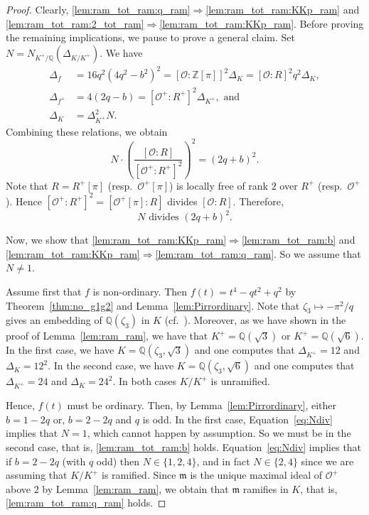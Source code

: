\documentclass[11pt]{amsart}
\newcommand\Q{\mathbb{Q}}
\newcommand\Z{\mathbb{Z}}
\newcommand\cO{\mathcal{O}}
\newcommand\frm{\mathfrak{m}}
\theoremstyle{plain}
\theoremstyle{definition}
\begin{document}
\begin{proof}
    Clearly, \ref{lem:ram_tot_ram:q_ram}$\Rightarrow$\ref{lem:ram_tot_ram:KKp_ram} and \ref{lem:ram_tot_ram:2_tot_ram}$\Rightarrow$\ref{lem:ram_tot_ram:KKp_ram}.
    Before proving the remaining implications, we pause to prove a general claim.
    Set $N= N_{K^+/\Q}(\Delta_{K/K^+})$.
    We have
    \begin{align*}
        \Delta_f & = 16q^2(4q^2-b^2)^2=[\cO:\Z[\pi]]^2\Delta_K = [\cO:R]^2q^2\Delta_K,\\
        \Delta_{f^+} & = 4(2q-b) = [\cO^+:R^+]^2\Delta_{K^+}, \text{ and}\\
        \Delta_K & = \Delta_{K^+}^2 N.
    \end{align*}
    Combining these relations, we obtain
    \[ N \cdot \left( \frac{[\cO:R]}{[\cO^+:R^+]^2} \right)^2 = (2q+b)^2. \]
    Note that $R=R^+[\pi]$ (resp.~$\cO^+[\pi]$) is locally free of rank $2$ over $R^+$ (resp.~$\cO^+$).
    Hence $[\cO^+:R^+]^2 = [\cO^+[\pi]:R]$ divides $[\cO:R]$.
    Therefore, 
    \begin{equation}\label{eq:Ndiv} 
        N\text{ divides }(2q+b)^2.
    \end{equation}

    Now, we show that \ref{lem:ram_tot_ram:KKp_ram}$\Rightarrow$\ref{lem:ram_tot_ram:b} and \ref{lem:ram_tot_ram:KKp_ram}$\Rightarrow$\ref{lem:ram_tot_ram:q_ram}.
    So we assume that $N\neq 1$.

    Assume first that $f$ is non-ordinary.
    Then $f(t)=t^4-qt^2+q^2$ by Theorem~\ref{thm:no_g1g2} and Lemma~\ref{lem:Pirrordinary}.
    Note that $\zeta_3 \mapsto -\pi^2/q$ gives an embedding of $\Q(\zeta_3)$ in $K$ (cf.~\cite[Sec.~4]{HMNR08}).
    Moreover, as we have shown in the proof of Lemma~\ref{lem:ram_ram}, we have that $K^+=\Q(\sqrt{3})$ or $K^+=\Q(\sqrt{6})$.
    In the first case, we have $K=\Q(\zeta_3,\sqrt{3})$ and one computes that $\Delta_{K^+}=12$ and $\Delta_K=12^2$.
    In the second case, we have $K=\Q(\zeta_3,\sqrt{6})$ and one computes that $\Delta_{K^+}=24$ and $\Delta_K=24^2$.
    In both cases $K/K^+$ is unramified.

    Hence, $f(t)$ must be ordinary.
    Then, by Lemma~\ref{lem:Pirrordinary}, either $b=1-2q$ or, $b=2-2q$ and $q$ is odd.
    In the first case, Equation~\eqref{eq:Ndiv} implies that $N=1$, which cannot happen by assumption.
    So we must be in the second case, that is, \ref{lem:ram_tot_ram:b} holds.
    Equation~\eqref{eq:Ndiv} implies that if $b=2-2q$ (with $q$ odd) then $N \in \{1,2,4\}$, and in fact $N \in \{2,4\}$ since we are assuming that $K/K^+$ is ramified.
    Since $\frm$ is the unique maximal ideal of $\cO^+$ above $2$ by Lemma~\ref{lem:ram_ram}, we obtain that $\frm$ ramifies in $K$, that is, \ref{lem:ram_tot_ram:q_ram} holds.


\end{proof}
\end{document}

